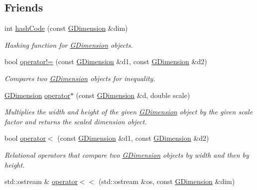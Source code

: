 \subsection*{Friends}
\begin{DoxyCompactItemize}
\item 
int \mbox{\hyperlink{classGDimension_a234b578e512fa99a9f3a829f5e461454}{hash\+Code}} (const \mbox{\hyperlink{classGDimension}{G\+Dimension}} \&dim)
\begin{DoxyCompactList}\small\item\em Hashing function for \mbox{\hyperlink{classGDimension}{G\+Dimension}} objects. \end{DoxyCompactList}\item 
bool \mbox{\hyperlink{classGDimension_a38754b56ceecfaa7cbf3947a19c8ceb6}{operator!=}} (const \mbox{\hyperlink{classGDimension}{G\+Dimension}} \&d1, const \mbox{\hyperlink{classGDimension}{G\+Dimension}} \&d2)
\begin{DoxyCompactList}\small\item\em Compares two \mbox{\hyperlink{classGDimension}{G\+Dimension}} objects for inequality. \end{DoxyCompactList}\item 
\mbox{\hyperlink{classGDimension}{G\+Dimension}} \mbox{\hyperlink{classGDimension_a84a7c3c5763523efef91d5b6398c730c}{operator$\ast$}} (const \mbox{\hyperlink{classGDimension}{G\+Dimension}} \&d, double scale)
\begin{DoxyCompactList}\small\item\em Multiplies the width and height of the given \mbox{\hyperlink{classGDimension}{G\+Dimension}} object by the given scale factor and returns the scaled dimension object. \end{DoxyCompactList}\item 
bool \mbox{\hyperlink{classGDimension_abcbb6e3b6e238b5155c96d6340bf5f43}{operator$<$}} (const \mbox{\hyperlink{classGDimension}{G\+Dimension}} \&d1, const \mbox{\hyperlink{classGDimension}{G\+Dimension}} \&d2)
\begin{DoxyCompactList}\small\item\em Relational operators that compare two \mbox{\hyperlink{classGDimension}{G\+Dimension}} objects by width and then by height. \end{DoxyCompactList}\item 
std\+::ostream \& \mbox{\hyperlink{classGDimension_a528e8a99e8c635db2eab715975ad0e8d}{operator$<$$<$}} (std\+::ostream \&os, const \mbox{\hyperlink{classGDimension}{G\+Dimension}} \&dim)

\end{DoxyCompactItemize}
